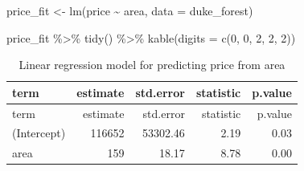 \documentclass[
  letterpaper,
  DIV=11,
  numbers=noendperiod]{scrartcl}
\newenvironment{Shaded}{\begin{snugshade}}{\end{snugshade}}
\newcommand{\AttributeTok}[1]{\textcolor[rgb]{0.40,0.45,0.13}{#1}}
\newcommand{\DecValTok}[1]{\textcolor[rgb]{0.68,0.00,0.00}{#1}}
\newcommand{\FunctionTok}[1]{\textcolor[rgb]{0.28,0.35,0.67}{#1}}
\newcommand{\NormalTok}[1]{\textcolor[rgb]{0.00,0.23,0.31}{#1}}
\newcommand{\OtherTok}[1]{\textcolor[rgb]{0.00,0.23,0.31}{#1}}
\newcommand{\SpecialCharTok}[1]{\textcolor[rgb]{0.37,0.37,0.37}{#1}}
\begin{document}
\begin{Shaded}
\begin{Highlighting}[]
\NormalTok{price\_fit }\OtherTok{\textless{}{-}} \FunctionTok{lm}\NormalTok{(price }\SpecialCharTok{\textasciitilde{}}\NormalTok{ area, }\AttributeTok{data =}\NormalTok{ duke\_forest)}
  
\NormalTok{price\_fit }\SpecialCharTok{\%\textgreater{}\%}
  \FunctionTok{tidy}\NormalTok{() }\SpecialCharTok{\%\textgreater{}\%}
  \FunctionTok{kable}\NormalTok{(}\AttributeTok{digits =} \FunctionTok{c}\NormalTok{(}\DecValTok{0}\NormalTok{, }\DecValTok{0}\NormalTok{, }\DecValTok{2}\NormalTok{, }\DecValTok{2}\NormalTok{, }\DecValTok{2}\NormalTok{))}
\end{Highlighting}
\end{Shaded}

\hypertarget{tbl-lm}{}
\begin{longtable}[]{@{}lrrrr@{}}
\caption{\label{tbl-lm}Linear regression model for predicting price from
area}\tabularnewline
\toprule()
term & estimate & std.error & statistic & p.value \\
\midrule()
\endfirsthead
\toprule()
term & estimate & std.error & statistic & p.value \\
\midrule()
\endhead
(Intercept) & 116652 & 53302.46 & 2.19 & 0.03 \\
area & 159 & 18.17 & 8.78 & 0.00 \\
\bottomrule()
\end{longtable}
\end{document}

